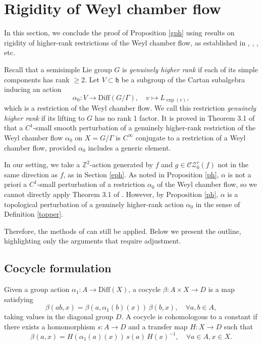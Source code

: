 \documentclass[11pt]{amsart}
\numberwithin{equation}{section}
\newcommand{\Z}{\mathbb{Z}}
\newcommand{\CZ}{\mathcal{CZ}}
\theoremstyle{plain}
\begin{document}
\section{Rigidity of Weyl chamber flow}\label{wcf}

In this section, we conclude the proof of Proposition \ref{gph} using results on rigidity of higher-rank restrictions of the Weyl chamber flow, as established in \cite{DK}, \cite{Vinhage}, \cite{VinWang}, etc.

Recall that a semisimple Lie group $G$ is \emph{genuinely higher rank} if each of its simple components has rank $\ge 2$. Let $V \subset \mathfrak{h}$ be a subgroup of the Cartan subalgebra inducing an action
\[
\alpha_0: V \to \mathrm{Diff}(G/\Gamma), \quad v \mapsto L_{\exp(v)},
\]
which is a restriction of the Weyl chamber flow. We call this restriction \emph{genuinely higher rank} if its lifting to $G$ has no rank 1 factor. It is proved in Theorem 3.1 of \cite{VinWang} that a $C^1$-small smooth perturbation of a genuinely higher-rank restriction of the Weyl chamber flow $\alpha_0$ on $X = G/\Gamma$ is $C^\infty$ conjugate to a restriction of a Weyl chamber flow, provided $\alpha_0$ includes a generic element.

In our setting, we take a $\Z^2$-action generated by $f$ and $g \in \CZ^r_0(f)$ not in the same direction as $f$, as in Section \ref{eph}. As noted in Proposition \ref{ph}, $\alpha$ is not a priori a $C^1$-small perturbation of a restriction $\alpha_0$ of the Weyl chamber flow, so we cannot directly apply Theorem 3.1 of \cite{VinWang}. However, by Proposition \ref{ph}, $\alpha$ is a topological perturbation of a genuinely higher-rank action $\alpha_0$ in the sense of Definition \ref{topper}.

Therefore, the methods of \cite{VinWang} can still be applied. Below we present the outline, highlighting only the arguments that require adjustment.

\subsection{Cocycle formulation}

Given a group action $\alpha_1: A \to \mathrm{Diff}(X)$, a cocycle $\beta: A \times X \to D$ is a map satisfying
\[
\beta(ab, x) = \beta(a, \alpha_1(b)(x)) \, \beta(b, x), \quad \forall a, b \in A,
\]
taking values in the diagonal group $D$. A cocycle is cohomologous to a constant if there exists a homomorphism $s: A \to D$ and a transfer map $H: X \to D$ such that
\[
\beta(a, x) = H(\alpha_1(a)(x)) \, s(a) \, H(x)^{-1}, \quad \forall a \in A, x \in X.
\]
\end{document}
